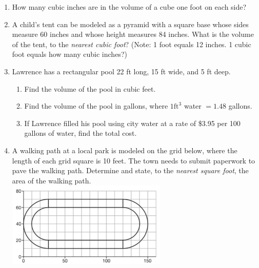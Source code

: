 \documentclass[12pt, twoside]{article}
\begin{document}
\begin{enumerate}
\newpage
  \item How many cubic inches are in the volume of a cube one foot on each side? \vspace{3.0cm}

  \item A child’s tent can be modeled as a pyramid with a square base whose sides measure 60 inches and whose height measures 84 inches. What is the volume of the tent, to the \emph{nearest cubic foot}? (Note: 1 foot equals 12 inches. 1 cubic foot equals how many cubic inches?) \vspace{4cm}

  \item Lawrence has a rectangular pool 22 ft long, 15 ft wide, and 5 ft deep.
  \begin{enumerate}
    \item Find the volume of the pool in cubic feet. \vspace{3cm}
    \item Find the volume of the pool in gallons, where $1 \mathrm{ ft}^3$ water $= 1.48$ gallons. \vspace{3cm}
    \item If Lawrence filled his pool using city water at a rate of \$3.95 per 100 gallons of water, find the total cost.
  \end{enumerate} \vspace{3cm}


\newpage
  \item A walking path at a local park is modeled on the grid below, where the length of each grid square is 10 feet. The town needs to submit paperwork to pave the walking path. Determine and state, to the \emph{nearest square foot}, the area of the walking path.\\[0.3cm]
    \includegraphics[width=0.6\textwidth]{path_Jan2019-31.png} \vspace{3cm}


\end{enumerate}
\end{document}
